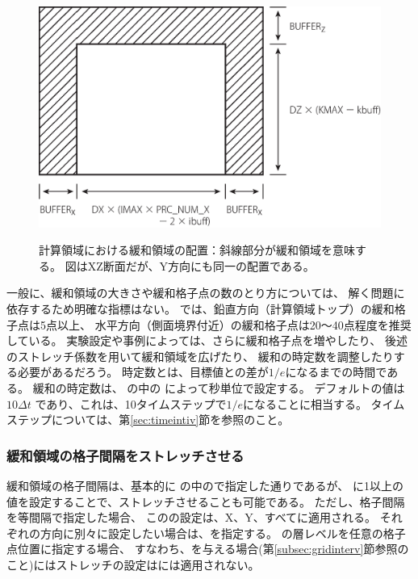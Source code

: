 \begin{figure}[t]
\begin{center}
  \includegraphics[width=0.8\hsize]{./figure/buffer_xz.eps}\\
  \caption{計算領域における緩和領域の配置：斜線部分が緩和領域を意味する。
  図はXZ断面だが、Y方向にも同一の配置である。}
  \label{fig:buff_xz}
\end{center}
\end{figure}


一般に、緩和領域の大きさや緩和格子点の数のとり方については、
解く問題に依存するため明確な指標はない。
\scalerm では、鉛直方向（計算領域トップ）の緩和格子点は5点以上、
水平方向（側面境界付近）の緩和格子点は20〜40点程度を推奨している。
実験設定や事例によっては、さらに緩和格子点を増やしたり、
後述のストレッチ係数を用いて緩和領域を広げたり、
緩和の時定数を調整したりする必要があるだろう。
時定数とは、目標値との差が$1/e$になるまでの時間である。
緩和の時定数は、
の中の
によって秒単位で設定する。
デフォルトの値は $10 \Delta t$ であり、これは、10タイムステップで$1/e$になることに相当する。
タイムステップについては、第\ref{sec:timeintiv}節を参照のこと。

\subsubsection{緩和領域の格子間隔をストレッチさせる}

緩和領域の格子間隔は、基本的に
の中ので指定した通りであるが、
に1以上の値を設定することで、ストレッチさせることも可能である。
ただし、格子間隔を等間隔で指定した場合、
このの設定は、X、Y、{\ZDIR}すべてに適用される。
それぞれの方向に別々に設定したい場合は、を指定する。
{\ZDIR}の層レベルを任意の格子点位置に指定する場合、
すなわち、を与える場合(第\ref{subsec:gridinterv}節参照のこと)にはストレッチの設定は{\ZDIR}には適用されない。

